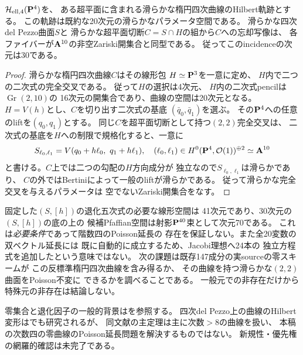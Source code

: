\begin{proposition}[反標準楕円四次曲線を中心とするincidence]
\label{prop:dp-elliptic-quartic-fibres}
$\mathcal H_{\mathrm{ell},4}(\PP^4)$を、
ある超平面に含まれる滑らかな楕円四次曲線のHilbert軌跡とする。
この軌跡は既約な20次元の滑らかなパラメータ空間である。
滑らかな四次del Pezzo曲面$S$と
滑らかな超平面切断$C=S\cap H$の組から$C$への忘却写像は、
各ファイバーが$\AA^{10}$の非空Zariski開集合と同型である。
従ってこのincidenceの次元は30である。
\end{proposition}
\begin{proof}
滑らかな楕円四次曲線$C$はその線形包
$H\simeq\PP^3$を一意に定め、
$H$内で二つの二次式の完全交叉である。
従って$H$の選択は4次元、
$H$内の二次式pencilは$\operatorname{Gr}(2,10)$の
16次元の開集合であり、曲線の空間は20次元となる。
$H=V(h)$とし、$C$を切り出す二次式の基底
$(\bar q_0,\bar q_1)$を選ぶ。
その$\PP^4$への任意のliftを$(q_0,q_1)$とする。
同じ$C$を超平面切断として持つ$(2,2)$完全交叉は、
二次式の基底を$H$への制限で規格化すると、一意に
\[
 S_{\ell_0,\ell_1}=
 V(q_0+h\ell_0,\ q_1+h\ell_1),\quad
 (\ell_0,\ell_1)\in
 H^0(\PP^4,\cO(1))^{\oplus2}\simeq\AA^{10}
\]
と書ける。$C$上では二つの勾配の$H$方向成分が
独立なので$S_{\ell_0,\ell_1}$は滑らかであり、
$C$の外ではBertiniによって一般のliftが滑らかである。
従って滑らかな完全交叉を与えるパラメータは
空でないZariski開集合をなす。
\end{proof}

\begin{remark}[147成分の幾何学的判定へ]
固定した$(S,[h])$の退化五次式の必要な線形空間は
41次元であり、30次元の$(S,[h])$の底の上の
候補Pfaffian空間は射影$\PP^{40}$束として次元70である。
これは\emph{必要条件}であって階数四のPoisson延長の
存在を保証しない。また全20変数の双ベクトル延長には
既に自動的に成立するため、Jacobi理想へ24本の
独立方程式を追加したという意味ではない。
次の課題は既存147成分の実sourceの零スキームが
この反標準楕円四次曲線を含み得るか、
その曲線を持つ滑らかな$(2,2)$曲面をPoisson不変に
できるかを調べることである。
一般元での非存在だけから特殊元の非存在は結論しない。

零集合と退化因子の一般的背景は\cite{PymSurvey}を参照する。
四次del Pezzo上の曲線のHilbert変形は\cite{Nasu2026}でも研究されるが、
同文献の主定理は主に次数$>8$の曲線を扱い、
本稿の次数四の零曲線のPoisson延長問題を解決するものではない。
新規性・優先権の網羅的確認は未完了である。
\end{remark}
